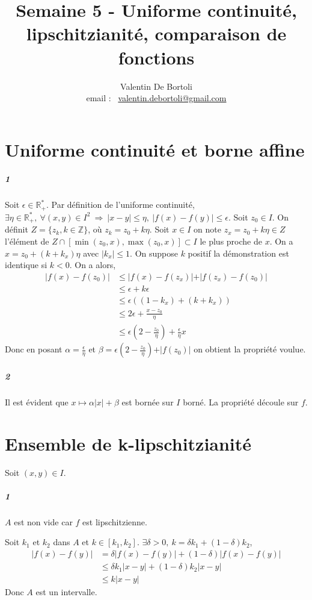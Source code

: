 \documentclass[10pt,a4paper]{article}
\title{Semaine 5 - Uniforme continuité, lipschitzianité, comparaison de fonctions}
\author{Valentin De Bortoli \\ email : \ \href{mailto:valentin.debortoli@gmail.com}{valentin.debortoli@gmail.com}}
\date{}
\begin{document}
\maketitle

\section{Uniforme continuité et borne affine}
\subparagraph{1}Soit $\epsilon \in \mathbb{R}_+^*$. Par définition de l'uniforme continuité, $\exists \eta \in \mathbb{R}_+^*, \ \forall (x,y) \in I^2 \ \Longrightarrow \ \vert x-y \vert \le \eta, \ \vert f(x) - f(y) \vert \le \epsilon$. Soit $z_0 \in I$. On définit $Z = \lbrace z_k, k \in \mathbb{Z} \rbrace$, où $z_k = z_0 + k \eta$. Soit $x \in I$ on note $z_x = z_0 + k\eta \in Z$ l'élément de $Z \cap [\min(z_0,x),\max(z_0,x)] \subset I$ le plus proche de $x$. On a $x = z_0 + (k+k_x) \eta$ avec $\vert k_x \vert \le 1$. On suppose $k$ positif la démonstration est identique si $k <0$. On a alors,
\begin{equation*}
\begin{aligned}
\vert f(x) - f(z_0) \vert &\le \vert f(x) - f(z_x) \vert + \vert f(z_x) - f(z_0) \vert \\
&\le \epsilon +  k \epsilon  \\
&\le \epsilon \left( (1-k_x) + (k+k_x) \right) \\
&\le 2 \epsilon + \frac{x-z_0}{\eta} \\
&\le \epsilon (2 - \frac{z_0}{\eta}) + \frac{\epsilon}{\eta} x
\end{aligned}
\end{equation*}
Donc en posant $\alpha = \frac{\epsilon}{\eta}$ et $\beta = \epsilon (2 - \frac{z_0}{\eta}) + \vert f(z_0) \vert$ on obtient la propriété voulue.
\subparagraph{2}Il est évident que $x \mapsto \alpha \vert x \vert + \beta$ est bornée sur $I$ borné. La propriété découle sur $f$. 

\section{Ensemble de k-lipschitzianité}
Soit $(x,y) \in I$.
\subparagraph{1}
$A$ est non vide car $f$ est lipschitzienne.

Soit $k_1$ et $k_2$ dans $A$ et $k \in [k_1,k_2]$. $\exists \delta >0, \ k = \delta k_1 + (1-\delta)k_2$,
\begin{equation*}
\begin{aligned}
\vert f(x) - f(y) \vert &= \delta \vert f(x) - f(y) \vert + (1-\delta) \vert f(x) - f(y) \vert \\
&\le \delta k_1 \vert x-y \vert + (1-\delta)k_2 \vert x-y \vert \\
&\le k \vert x-y \vert
\end{aligned}
\end{equation*}
Donc $A$ est un intervalle.
\end{document}
